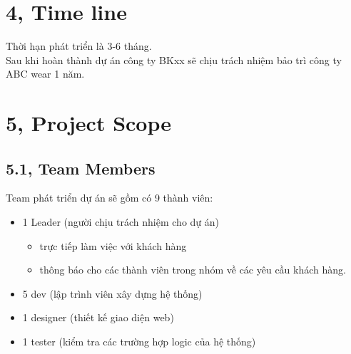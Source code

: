 \documentclass[a4paper,11pt]{report}
\begin{document}
\section*{4, Time line}
Thời hạn phát triển là 3-6 tháng. \\
Sau khi hoàn thành dự án công ty BKxx sẽ chịu trách nhiệm bảo trì công ty ABC wear 1 năm.
\section*{5, Project Scope}
\subsection*{5.1, Team Members}
Team phát triển dự án sẽ gồm có 9 thành viên:
\begin{itemize}
\item 1 Leader (người chịu trách nhiệm cho dự án)
\begin{itemize}
\item trực tiếp làm việc với khách hàng
\item thông báo cho các thành viên trong nhóm về các yêu cầu khách hàng.
\end{itemize}
\item 5 dev (lập trình viên xây dựng hệ thống)
\item 1 designer (thiết kế giao diện web)
\item 1 tester (kiểm tra các trường hợp logic của hệ thống)
\end{itemize}
\end{document}
